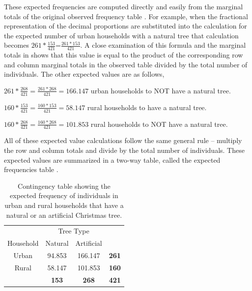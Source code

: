 \documentclass[10pt,openany]{book}\usepackage[]{graphicx}\usepackage[]{color}
\begin{document}
These expected frequencies are computed directly and easily from the marginal totals of the original observed frequency table .  For example, when the fractional representation of the decimal proportions are substituted into the calculation for the expected number of urban households with a natural tree that calculation becomes $261*\frac{153}{421}$=$\frac{261*153}{421}$.  A close examination of this formula and the marginal totals in  shows that this value is equal to the product of the corresponding row and column marginal totals in the observed table divided by the total number of individuals.  The other expected values are as follows,
\begin{Itemize}
  \item $261*\frac{268}{421}=\frac{261*268}{421}=166.147$ urban households to NOT have a natural tree.
  \item $160*\frac{153}{421}=\frac{160*153}{421}=58.147$ rural households to have a natural tree.
  \item $160*\frac{268}{421}=\frac{160*268}{421}=101.853$ rural households to NOT have a natural tree.
\end{Itemize}
All of these expected value calculations follow the same general rule -- multiply the row and column totals and divide by the total number of individuals.  These expected values are summarized in a two-way table, called the expected frequencies table .

\begin{table}[htbp]
  \centering
  \caption{Contingency table showing the expected frequency of individuals in urban and rural households that have a natural or an artificial Christmas tree.}\label{tab:ChiTreeExp}
    \begin{tabular}{c|c|c|c|}
      \multicolumn{1}{c}{} & \multicolumn{2}{c}{Tree Type} & \multicolumn{1}{c}{} \\
      \cline{2-3}
      Household & Natural & Artificial & \multicolumn{1}{c}{} \\
      \hline
      \multicolumn{1}{|c|}{Urban} & 94.853 & 166.147 & \textbf{261} \\
      \hline
      \multicolumn{1}{|c|}{Rural} & 58.147 & 101.853 & \textbf{160} \\
      \hline
       & \textbf{153} & \textbf{268} & \textbf{421} \\
      \cline{2-4}
    \end{tabular}
\end{table}
\end{document}
